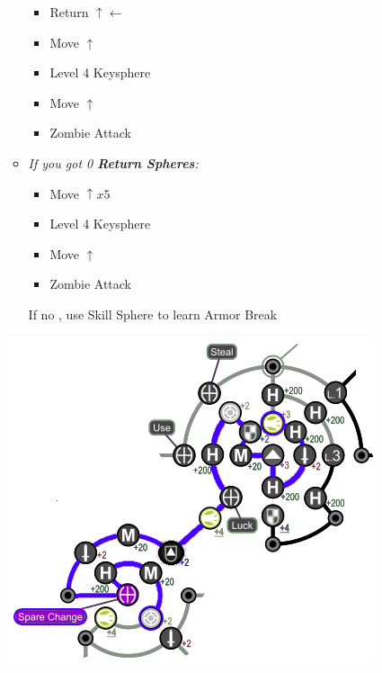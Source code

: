\begin{spheregrid}
\begin{multicols}{2}
\begin{itemize}
\begin{itemize}
                    	\begin{itemize}
                    	\item Return $\uparrow\leftarrow$
                    	\item Move $\uparrow$
                    	\item Level 4 Keysphere
                    	\item Move $\uparrow$
                    	\item Zombie Attack
                    	\end{itemize}
              \item \textit{If you got 0 \textbf{Return Spheres}:}
                    \begin{itemize}
                    \item Move $\uparrow x5$
                    	\item Level 4 Keysphere
                    	\item Move $\uparrow$
                    	\item Zombie Attack
                    \end{itemize}
                    	
                    \rikkuf If no \od, use Skill Sphere to learn Armor Break
                    \end{itemize}
            \includegraphics[width=.8\columnwidth]{graphics/bahamut_ending_final_grid}
    \end{itemize}
    \end{multicols}
\end{spheregrid}
